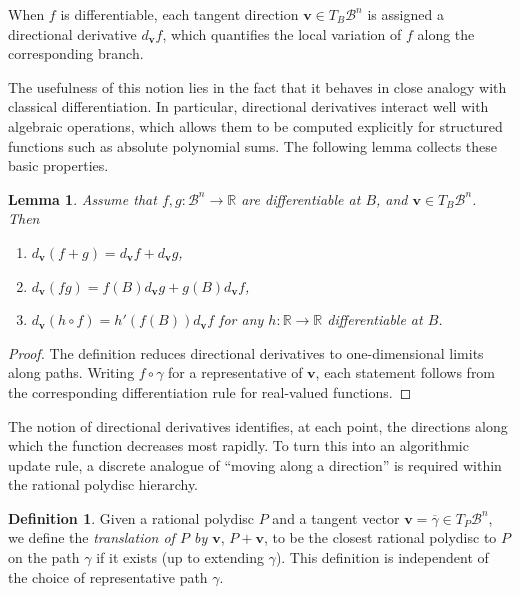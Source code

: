 \documentclass[10pt]{article}
\newtheorem{lemma}[theorem]{Lemma}
\theoremstyle{definition}
\newtheorem{definition}[theorem]{Definition}
\newcommand{\RR}{\mathbb{R}}
\renewcommand{\vec}[1]{\mathbf{#1}}
\begin{document}
When $f$ is differentiable, each tangent direction $\vec{v} \in T_B \mathcal{B}^n$ is assigned a directional derivative $d_{\vec{v}} f$, which quantifies the local variation of $f$ along the corresponding branch.

The usefulness of this notion lies in the fact that it behaves in close analogy with classical differentiation. In particular, directional derivatives interact well with algebraic operations, which allows them to be computed explicitly for structured functions such as absolute polynomial sums. The following lemma collects these basic properties.

\begin{lemma}
Assume that $f, g\colon \mathcal{B}^n \to \RR$ are differentiable at $B$, and $\vec{v} \in T_B \mathcal{B}^n$. Then
\begin{enumerate}
    \item $d_{\vec{v}} (f + g) = d_{\vec{v}} f + d_{\vec{v}} g$, 
    \item $d_{\vec{v}} (fg) = f(B)  d_{\vec{v}} g + g(B) d_{\vec{v}} f$, 
    \item $d_{\vec{v}} (h \circ f) = h'(f(B)) d_{\vec{v}} f$ for any $h\colon \RR \to \RR$ differentiable at $B$.
\end{enumerate}
\end{lemma}

\begin{proof}
The definition reduces directional derivatives to one-dimensional limits along paths. Writing $f \circ \gamma$ for a representative of $\vec{v}$, each statement follows from the corresponding differentiation rule for real-valued functions.
\end{proof}

The notion of directional derivatives identifies, at each point, the directions along which the function decreases most rapidly. To turn this into an algorithmic update rule, a discrete analogue of ``moving along a direction'' is required within the rational polydisc hierarchy.

\begin{definition}
    Given a rational polydisc $P$ and a tangent vector $\vec{v} = \overline\gamma \in T_P\mathcal{B}^n$, we define the \emph{translation of $P$ by $\vec{v}$}, $P + \vec v$, to be the closest rational polydisc to $P$ on the path $\gamma$ if it exists (up to extending $\gamma$). This definition is independent of the choice of representative path $\gamma$.
\end{definition}
\end{document}
